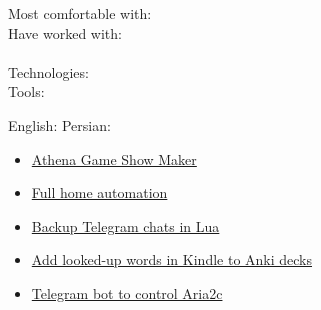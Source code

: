 Most comfortable with:   \\
Have worked with:     \\
\divider\\
Technologies:        
\divider\\
Tools:        


English: 
Persian: 



\begin{itemize}
\item {\href{https://www.athenagameshow.com/}{Athena Game Show Maker}}
\item {\href{https://github.com/psamim/appdaemon-apps}{Full home automation}}
\item {\href{https://github.com/psamim/telegram-cli-backup}{Backup Telegram chats in Lua}}
\item {\href{https://github.com/psamim/kindle2anki}{Add looked-up words in Kindle to Anki decks}}
\item {\href{https://github.com/psamim/aria2-telegram-bot}{Telegram bot to control Aria2c}}


\end{itemize}


